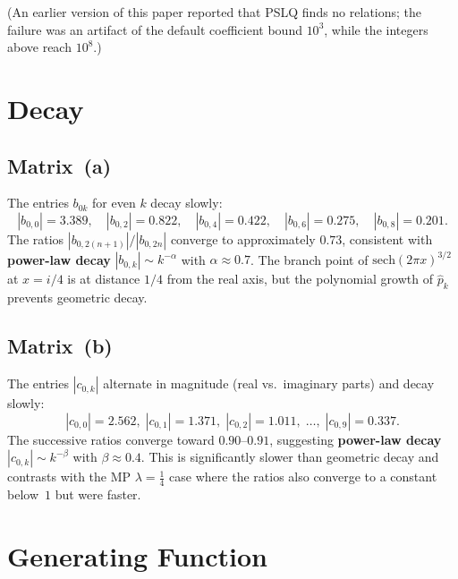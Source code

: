\documentclass[11pt,a4paper]{article}
\begin{document}
(An earlier version of this paper reported that PSLQ finds no
relations; the failure was an artifact of the default coefficient
bound $10^3$, while the integers above reach $10^8$.)

\section{Decay}\label{sec:decay}

\subsection{Matrix~(a)}

The entries $b_{0k}$ for even $k$ decay slowly:
\[
  |b_{0,0}| = 3.389, \quad
  |b_{0,2}| = 0.822, \quad
  |b_{0,4}| = 0.422, \quad
  |b_{0,6}| = 0.275, \quad
  |b_{0,8}| = 0.201.
\]
The ratios $|b_{0,2(n+1)}|/|b_{0,2n}|$ converge to approximately
$0.73$, consistent with \textbf{power-law decay} $|b_{0,k}| \sim k^{-\alpha}$
with $\alpha \approx 0.7$.
The branch point of $\mathrm{sech}(2\pi x)^{3/2}$ at $x = i/4$
is at distance $1/4$ from the real axis, but the polynomial
growth of $\widehat{p}_k$ prevents geometric decay.

\subsection{Matrix~(b)}

The entries $|c_{0,k}|$ alternate in magnitude (real vs.\ imaginary
parts) and decay slowly:
\[
  |c_{0,0}| = 2.562, \;
  |c_{0,1}| = 1.371, \;
  |c_{0,2}| = 1.011, \;
  \ldots, \;
  |c_{0,9}| = 0.337.
\]
The successive ratios converge toward $0.90$--$0.91$, suggesting
\textbf{power-law decay} $|c_{0,k}| \sim k^{-\beta}$ with
$\beta \approx 0.4$. This is significantly slower than geometric
decay and contrasts with the MP $\lambda = \tfrac14$ case where
the ratios also converge to a constant below~$1$ but were faster.

\section{Generating Function}\label{sec:gf}
\end{document}
